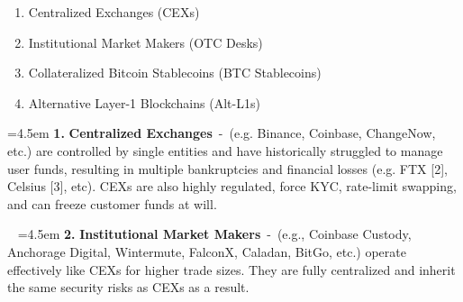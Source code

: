 \documentclass[
]{article}
\providecommand{\tightlist}{%
  \setlength{\itemsep}{0pt}\setlength{\parskip}{0pt}}
\begin{document}

\vspace*{\baselineskip}


\hspace{3em}{Users who want to swap between Bitcoin and Ethereum today have 4
options:}

{}

{
\addtolength{\leftmargini}{1cm} %
\begin{enumerate}
\tightlist
\item
  {Centralized Exchanges (CEXs)}
\item
  {Institutional Market Makers (OTC Desks)}
\item
  {Collateralized Bitcoin Stablecoins (BTC Stablecoins)}
\item
  {Alternative Layer-1 Blockchains (Alt-L1s)}
\end{enumerate}
}


\vspace*{\baselineskip}


\hspace{3em}{All of these suffer from the same core problems: they are far less
secure than the base chains users hold assets on, and come with other
inherent risks:}
\vspace*{\baselineskip}

\noindent
\hangindent=4.5em
\hspace{3em}\textbf{1.} \textbf{Centralized Exchanges}{~}{-}{~}{(e.g. Binance, Coinbase,
ChangeNow, etc.) are controlled by single entities and have historically
struggled to manage user funds, resulting in multiple bankruptcies and
financial losses (e.g. FTX {[}2{]}, Celsius {[}3{]}, etc). CEXs are also
highly regulated, force KYC, rate-limit swapping, and can freeze
customer funds at will.}

\
\noindent
\hangindent=4.5em
\hspace{3em}\textbf{2.} \textbf{Institutional Market Makers}{~}{-}{~}{(e.g., Coinbase Custody,
Anchorage Digital, Wintermute, FalconX, Caladan, BitGo, etc.) operate
effectively like CEXs for higher trade sizes. They are fully centralized
and inherit the same security risks as CEXs as a result.}
\end{document}
